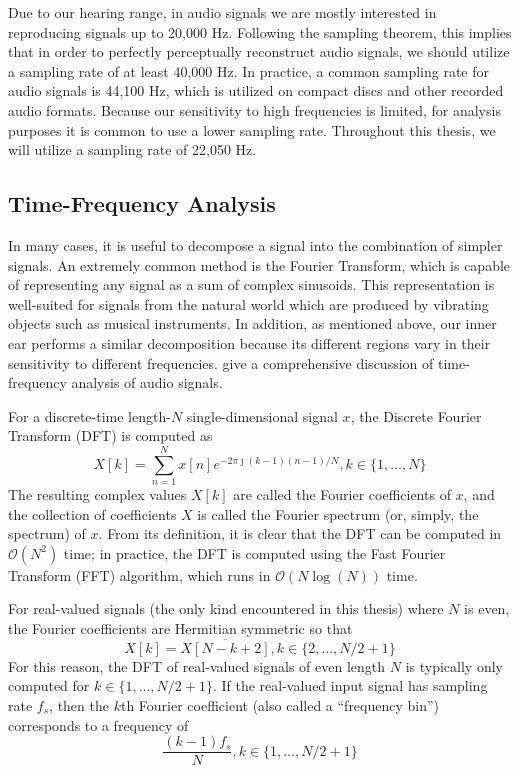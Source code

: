 Due to our hearing range, in audio signals we are mostly interested in reproducing signals up to 20,000 Hz.
Following the sampling theorem, this implies that in order to perfectly perceptually reconstruct audio signals, we should utilize a sampling rate of at least 40,000 Hz.
In practice, a common sampling rate for audio signals is 44,100 Hz, which is utilized on compact discs and other recorded audio formats.
Because our sensitivity to high frequencies is limited, for analysis purposes it is common to use a lower sampling rate.
Throughout this thesis, we will utilize a sampling rate of 22,050 Hz.

\subsection{Time-Frequency Analysis}

In many cases, it is useful to decompose a signal into the combination of simpler signals.
An extremely common method is the Fourier Transform, which is capable of representing any signal as a sum of complex sinusoids.
This representation is well-suited for signals from the natural world which are produced by vibrating objects such as musical instruments.
In addition, as mentioned above, our inner ear performs a similar decomposition because its different regions vary in their sensitivity to different frequencies.
\cite{smith2011spectral,smith2007mathematics} give a comprehensive discussion of time-frequency analysis of audio signals.

For a discrete-time length-$N$ single-dimensional signal $x$, the Discrete Fourier Transform (DFT) is computed as
\begin{equation}
        X[k] = \sum_{n = 1}^N x[n] e^{-2\pi \jmath (k - 1)(n - 1)/N}, k \in \{1, \ldots, N\}
\end{equation}
The resulting complex values $X[k]$ are called the Fourier coefficients of $x$, and the collection of coefficients $X$ is called the Fourier spectrum (or, simply, the spectrum) of $x$.
From its definition, it is clear that the DFT can be computed in $\mathcal{O}(N^2)$ time; in practice, the DFT is computed using the Fast Fourier Transform (FFT) algorithm, which runs in $\mathcal{O}(N \log(N))$ time.

For real-valued signals (the only kind encountered in this thesis) where $N$ is even, the Fourier coefficients are Hermitian symmetric so that
\begin{equation}
        X[k] = \overline{X[N - k + 2]}, k \in \{2, \ldots, N/2 + 1\}
\end{equation}
For this reason, the DFT of real-valued signals of even length $N$ is typically only computed for $k \in \{1, \ldots, N/2 + 1\}$.
If the real-valued input signal has sampling rate $f_s$, then the $k$th Fourier coefficient (also called a ``frequency bin'') corresponds to a frequency of
\begin{equation}
        \frac{(k - 1)f_s}{N}, k \in \{1, \ldots, N/2 + 1\}
        \label{eq:bin_freq}
\end{equation}

